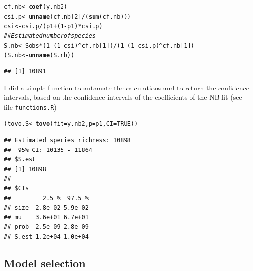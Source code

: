 \documentclass[12pt, A4]{article}\usepackage[]{graphicx}\usepackage[]{color}
\makeatletter
\newcommand{\hlnum}[1]{\textcolor[rgb]{0.686,0.059,0.569}{#1}}%
\newcommand{\hlcom}[1]{\textcolor[rgb]{0.678,0.584,0.686}{\textit{#1}}}%
\newcommand{\hlopt}[1]{\textcolor[rgb]{0,0,0}{#1}}%
\newcommand{\hlstd}[1]{\textcolor[rgb]{0.345,0.345,0.345}{#1}}%
\newcommand{\hlkwb}[1]{\textcolor[rgb]{0.69,0.353,0.396}{#1}}%
\newcommand{\hlkwc}[1]{\textcolor[rgb]{0.333,0.667,0.333}{#1}}%
\newcommand{\hlkwd}[1]{\textcolor[rgb]{0.737,0.353,0.396}{\textbf{#1}}}%
\newenvironment{kframe}{%
 \def\at@end@of@kframe{}%
 \ifinner\ifhmode%
  \def\at@end@of@kframe{\end{minipage}}%
  \begin{minipage}{\columnwidth}%
 \fi\fi%
 \def\FrameCommand##1{\hskip\@totalleftmargin \hskip-\fboxsep
 \colorbox{shadecolor}{##1}\hskip-\fboxsep
     \hskip-\linewidth \hskip-\@totalleftmargin \hskip\columnwidth}%
 \MakeFramed {\advance\hsize-\width
   \@totalleftmargin\z@ \linewidth\hsize
   \@setminipage}}%
 {\par\unskip\endMakeFramed%
 \at@end@of@kframe}
\newenvironment{knitrout}{}{} %
\newcommand{\code}[1]{\texttt{#1}}
\makeatother
\begin{document}
 
\begin{knitrout}
\color{fgcolor}\begin{kframe}
\begin{alltt}
\hlstd{cf.nb} \hlkwb{<-} \hlkwd{coef}\hlstd{(y.nb2)}
\hlstd{csi.p} \hlkwb{<-} \hlkwd{unname}\hlstd{(cf.nb[}\hlnum{2}\hlstd{]}\hlopt{/}\hlstd{(}\hlkwd{sum}\hlstd{(cf.nb)))}
\hlstd{csi} \hlkwb{<-} \hlstd{csi.p}\hlopt{/}\hlstd{(p1}\hlopt{+}\hlstd{(}\hlnum{1}\hlopt{-}\hlstd{p1)}\hlopt{*}\hlstd{csi.p)}
\hlcom{## Estimated number of species }
\hlstd{S.nb} \hlkwb{<-} \hlstd{Sobs}\hlopt{*}\hlstd{(}\hlnum{1}\hlopt{-}\hlstd{(}\hlnum{1}\hlopt{-}\hlstd{csi)}\hlopt{^}\hlstd{cf.nb[}\hlnum{1}\hlstd{])} \hlopt{/} \hlstd{(}\hlnum{1}\hlopt{-}\hlstd{(}\hlnum{1}\hlopt{-}\hlstd{csi.p)}\hlopt{^}\hlstd{cf.nb[}\hlnum{1}\hlstd{])}
\hlstd{(S.nb} \hlkwb{<-} \hlkwd{unname}\hlstd{(S.nb))}
\end{alltt}
\begin{verbatim}
## [1] 10891
\end{verbatim}
\end{kframe}
\end{knitrout}

I did a simple function to automate the calculations and to return
the confidence intervals, based on the confidence intervals of the 
coefficients of the NB fit (see file \code{functions.R})

 
\begin{knitrout}
\color{fgcolor}\begin{kframe}
\begin{alltt}
\hlstd{(tovo.S} \hlkwb{<-} \hlkwd{tovo}\hlstd{(}\hlkwc{fit} \hlstd{= y.nb2,} \hlkwc{p} \hlstd{= p1,} \hlkwc{CI}\hlstd{=}\hlnum{TRUE}\hlstd{))}
\end{alltt}
\begin{verbatim}
## Estimated species richness: 10898 
##  95% CI: 10135 - 11864
## $S.est
## [1] 10898
## 
## $CIs
##         2.5 %  97.5 %
## size  2.8e-02 5.9e-02
## mu    3.6e+01 6.7e+01
## prob  2.5e-09 2.8e-09
## S.est 1.2e+04 1.0e+04
\end{verbatim}
\end{kframe}
\end{knitrout}


\subsection*{Model selection}
\end{document}
